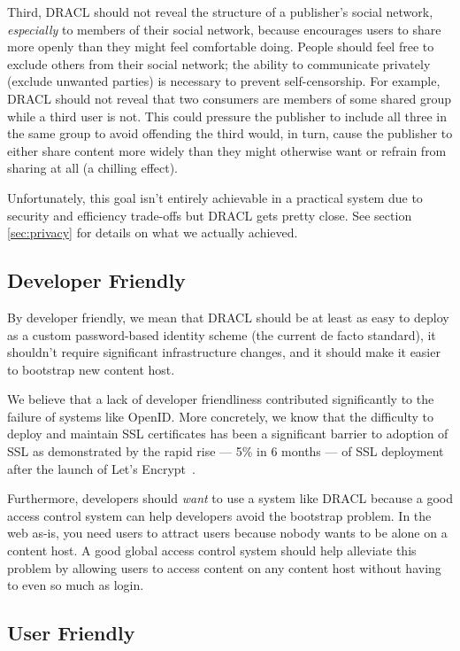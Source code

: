 \documentclass[pdftex,12pt,a4papaer]{report}
\begin{document}
Third, DRACL should not reveal the structure of a publisher's social network,
\emph{especially} to members of their social network, because encourages users
to share more openly than they might feel comfortable doing. People should feel free to exclude others from their
social network; the ability to communicate privately (exclude unwanted parties)
is necessary to prevent self-censorship. For example, DRACL should not reveal
that two consumers are members of some shared group while a third user is not.
This could pressure the publisher to include all three in the same group to
avoid offending the third would, in turn, cause the publisher to either
share content more widely than they might otherwise want or refrain from sharing
at all (a chilling effect).

Unfortunately, this goal isn't entirely achievable in a practical system due to
security and efficiency trade-offs but DRACL gets pretty close. See section
\ref{sec:privacy} for details on what we actually achieved.

\subsection{Developer Friendly}
\label{sub:goal-developer}

By developer friendly, we mean that DRACL should be at least as easy to deploy
as a custom password-based identity scheme (the current de facto standard), it 
shouldn't require significant infrastructure changes, and it should make it
easier to bootstrap new content host.

We believe that a lack of developer friendliness contributed significantly to
the failure of systems like OpenID\cite{openid}. More concretely, we know that
the difficulty to deploy and maintain SSL certificates has been a significant
barrier to adoption of SSL as demonstrated by the rapid rise --- 5\% in 6 months
--- of SSL deployment after the launch of Let's Encrypt~\cite{lets-encrypt}.

Furthermore, developers should \emph{want} to use a system like DRACL because a
good access control system can help developers avoid the bootstrap problem. In
the web as-is, you need users to attract users because nobody wants to be alone
on a content host. A good global access control system should help alleviate
this problem by allowing users to access content on any content host without
having to even so much as login.

\subsection{User Friendly}
\label{sub:goal-user}
\end{document}
